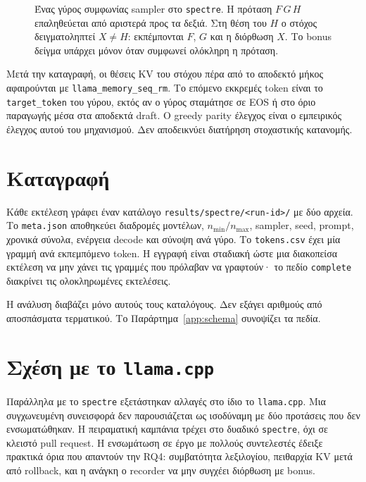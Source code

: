 \documentclass[a4paper,12pt]{report}
\theoremstyle{plain}
\theoremstyle{definition}
\theoremstyle{remark}
\begin{document}
\begin{figure}[htbp]
  \centering
  \resizebox{\linewidth}{!}{}
  \caption{Ένας γύρος συμφωνίας sampler στο \texttt{spectre}. Η πρόταση
    \(F\,G\,H\) επαληθεύεται από αριστερά προς τα δεξιά. Στη θέση του \(H\) ο
    στόχος δειγματοληπτεί \(X\neq H\): εκπέμπονται \(F\), \(G\) και η διόρθωση
  \(X\). Το bonus δείγμα υπάρχει μόνον όταν συμφωνεί ολόκληρη η πρόταση.}
  \label{fig:verify-round}
\end{figure}

Μετά την καταγραφή, οι θέσεις KV του στόχου πέρα από το αποδεκτό μήκος
αφαιρούνται με \texttt{llama\_memory\_seq\_rm}. Το επόμενο εκκρεμές token είναι
το \texttt{target\_token} του γύρου, εκτός αν ο γύρος σταμάτησε σε EOS ή στο
όριο παραγωγής μέσα στα αποδεκτά draft. Ο greedy parity έλεγχος είναι ο
εμπειρικός έλεγχος αυτού του μηχανισμού. Δεν αποδεικνύει διατήρηση
στοχαστικής κατανομής.

\section{Καταγραφή}
\label{sec:repro}

Κάθε εκτέλεση γράφει έναν κατάλογο
\texttt{results/spectre/\textless run-id\textgreater/} με δύο αρχεία. Το
\texttt{meta.json} αποθηκεύει διαδρομές μοντέλων, \(n_{\min}/n_{\max}\),
sampler, seed, prompt, χρονικά σύνολα, ενέργεια decode και σύνοψη ανά γύρο.
Το \texttt{tokens.csv} έχει μία γραμμή ανά εκπεμπόμενο token. Η εγγραφή είναι
σταδιακή ώστε μια διακοπείσα εκτέλεση να μην χάνει τις γραμμές που πρόλαβαν
να γραφτούν· το πεδίο \texttt{complete} διακρίνει τις ολοκληρωμένες
εκτελέσεις.

Η ανάλυση διαβάζει μόνο αυτούς τους καταλόγους. Δεν εξάγει αριθμούς από
αποσπάσματα τερματικού. Το Παράρτημα~\ref{app:schema} συνοψίζει τα πεδία.

\section{Σχέση με το \texttt{llama.cpp}}

Παράλληλα με το \texttt{spectre} εξετάστηκαν αλλαγές στο ίδιο το
\texttt{llama.cpp}. Μια συγχωνευμένη συνεισφορά δεν παρουσιάζεται ως
ισοδύναμη με δύο προτάσεις που δεν ενσωματώθηκαν. Η πειραματική καμπάνια
τρέχει στο δυαδικό \texttt{spectre}, όχι σε κλειστό pull request. Η
ενσωμάτωση σε έργο με
πολλούς συντελεστές έδειξε πρακτικά όρια που απαντούν την RQ4: συμβατότητα
λεξιλογίου, πειθαρχία KV μετά από rollback, και η ανάγκη ο recorder να μην
συγχέει διόρθωση με bonus.
\end{document}
